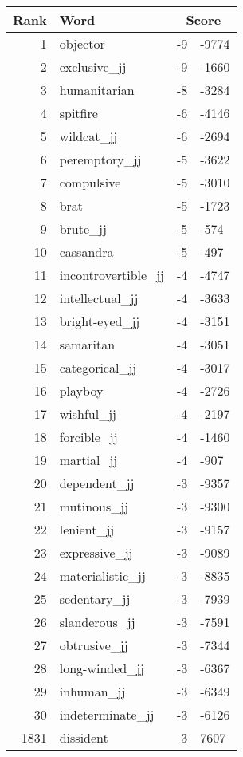 \begin{longtable}[!htbp]{| rlr@{.}l |}
    \hline
    \textbf{Rank} & \textbf{Word} & \multicolumn{2}{c|}{\textbf{Score}} \\
    \hline
    \endhead
    1 & objector & -9 & -9774 \\
    2 & exclusive\_jj & -9 & -1660 \\
    3 & humanitarian & -8 & -3284 \\
    4 & spitfire & -6 & -4146 \\
    5 & wildcat\_jj & -6 & -2694 \\
    6 & peremptory\_jj & -5 & -3622 \\
    7 & compulsive & -5 & -3010 \\
    8 & brat & -5 & -1723 \\
    9 & brute\_jj & -5 & -574 \\
    10 & cassandra & -5 & -497 \\
    11 & incontrovertible\_jj & -4 & -4747 \\
    12 & intellectual\_jj & -4 & -3633 \\
    13 & bright-eyed\_jj & -4 & -3151 \\
    14 & samaritan & -4 & -3051 \\
    15 & categorical\_jj & -4 & -3017 \\
    16 & playboy & -4 & -2726 \\
    17 & wishful\_jj & -4 & -2197 \\
    18 & forcible\_jj & -4 & -1460 \\
    19 & martial\_jj & -4 & -907 \\
    20 & dependent\_jj & -3 & -9357 \\
    21 & mutinous\_jj & -3 & -9300 \\
    22 & lenient\_jj & -3 & -9157 \\
    23 & expressive\_jj & -3 & -9089 \\
    24 & materialistic\_jj & -3 & -8835 \\
    25 & sedentary\_jj & -3 & -7939 \\
    26 & slanderous\_jj & -3 & -7591 \\
    27 & obtrusive\_jj & -3 & -7344 \\
    28 & long-winded\_jj & -3 & -6367 \\
    29 & inhuman\_jj & -3 & -6349 \\
    30 & indeterminate\_jj & -3 & -6126 \\
    1831 & dissident & 3 & 7607 \\

\end{longtable}
